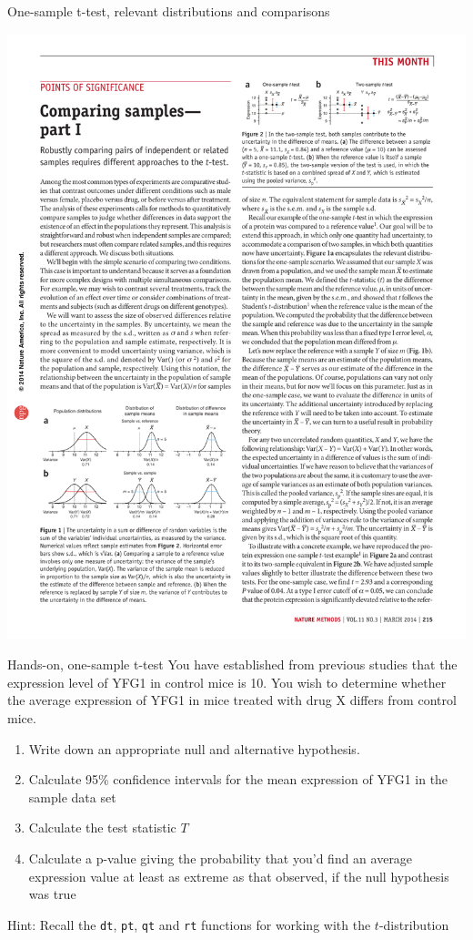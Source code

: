 \documentclass[presentation]{beamer}
\begin{document}
\begin{frame}[label={sec:org26ca729}]{One-sample t-test, relevant distributions and comparisons}
\begin{center}
\includegraphics[height=0.30\textheight]{fig-onesample-ttest.pdf}
\end{center}
\end{frame}


\begin{frame}[fragile,label={sec:orgce6e76d}]{Hands-on, one-sample t-test}
 You have established from previous studies that the expression level of YFG1 in control mice is 10.  You wish to determine whether the average expression of YFG1 in mice treated with drug X differs from control mice.

\begin{enumerate}
\item Write down an appropriate null and alternative hypothesis.
\item Calculate 95\% confidence intervals for the mean expression of YFG1 in the sample data set
\item Calculate the test statistic \(T\)
\item Calculate a p-value giving the probability that you'd find an average expression value at least as extreme as that observed, if the null hypothesis was true
\end{enumerate}

Hint: Recall the \texttt{dt}, \texttt{pt}, \texttt{qt} and \texttt{rt} functions for working with the \(t\)-distribution
\end{frame}
\end{document}
